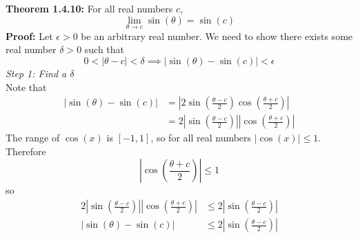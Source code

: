 \documentclass{article}
\begin{document}
	\textbf{Theorem 1.4.10:} For all real numbers $c$,
	$$\lim_{\theta \to c}{\sin{(\theta)}} = \sin{(c)}$$
	\textbf{Proof:}
	Let $\epsilon > 0$ be an arbitrary real number. We need to show there exists some real number $\delta > 0$ such that
	$$0 < |\theta - c| < \delta \implies |\sin{(\theta)} - \sin{(c)}| < \epsilon$$
	\textit{Step 1: Find a $\delta$} \\
	Note that
	\begin{align*}
		|\sin{(\theta)} - \sin{(c)}| &= \left|2\sin{\left(\frac{\theta - c}{2}\right)}\cos{\left(\frac{\theta + c}{2}\right)}\right| \tag{Sum to Product Formula} \\
									 &= 2\left|\sin{\left(\frac{\theta - c}{2}\right)}\right|\left|\cos{\left(\frac{\theta + c}{2}\right)} \right|
	\end{align*}
	The range of $\cos{(x)}$ is $[-1, 1]$, so for all real numbers $|\cos{(x)}| \leq 1$. Therefore
	$$\left|\cos{\left(\frac{\theta + c}{2}\right)} \right| \leq 1$$
	so
	\begin{align*}
		2\left|\sin{\left(\frac{\theta - c}{2}\right)}\right|\left|\cos{\left(\frac{\theta + c}{2}\right)} \right| &\leq 2\left|\sin{\left(\frac{\theta - c}{2}\right)}\right| \\
		|\sin{(\theta)} - \sin{(c)}| &\leq 2\left|\sin{\left(\frac{\theta - c}{2}\right)}\right|
	\end{align*}
\end{document}
